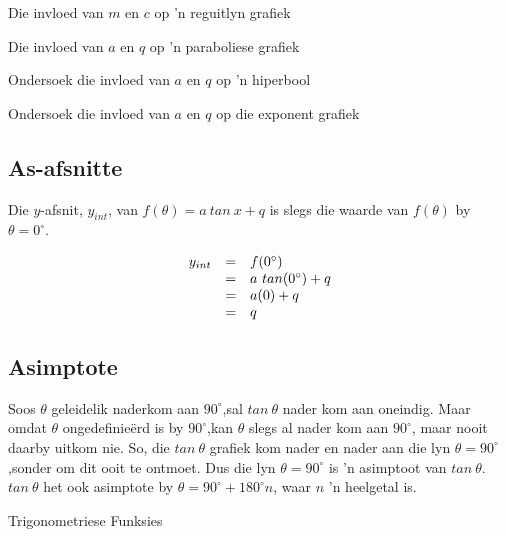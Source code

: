 \begin{Ondersoek}{Die invloed van $m$ en $c$ op 'n reguitlyn grafiek}
\begin{Ondersoek}{Die invloed van $a$ en $q$ op 'n paraboliese grafiek}
\begin{Ondersoek}{Ondersoek die invloed van $a$ en $q$ op 'n hiperbool}
\begin{Ondersoek}{Ondersoek die invloed van $a$ en $q$ op die exponent grafiek}
\subsection*{As-afsnitte}
\nopagebreak
Die $y$-afsnit, ${y}_{int}$, van $f(\theta )=a~tan~x+q$ is slegs die waarde van $f(\theta )$ by $\theta ={0}^{\circ }$.\par 
\nopagebreak\noindent{}
\begin{equation*}
\begin{array}{ccc}\hfill {y}_{int}& =& f({0}^{\circ })\hfill \\
 & =& a~tan({0}^{\circ })+q\hfill \\
 & =& a(0)+q\hfill \\
 & =& q\hfill 
\end{array}
\end{equation*}

\subsection*{Asimptote}
\nopagebreak
Soos $\theta $ geleidelik naderkom aan ${90}^{\circ }$,sal $tan~\theta $ nader kom aan oneindig. Maar omdat $\theta $ ongedefinieërd is by ${90}^{\circ }$,kan $\theta $ slegs al nader kom aan ${90}^{\circ }$, maar nooit daarby uitkom nie. So, die $tan~\theta $ grafiek kom nader en nader aan
die lyn  $\theta ={90}^{\circ }$,sonder om dit ooit te ontmoet. Dus die lyn $\theta ={90}^{\circ }$ is ’n asimptoot van $tan~\theta $. $tan~\theta $ het ook
asimptote by $\theta ={90}^{\circ }+{180}^{\circ }n$, waar $n$ ’n heelgetal is.\par 

\begin{exercises}{ Trigonometriese Funksies}
 {

}
\end{exercises}
\end{Ondersoek}
\end{Ondersoek}
\end{Ondersoek}
\end{Ondersoek}
